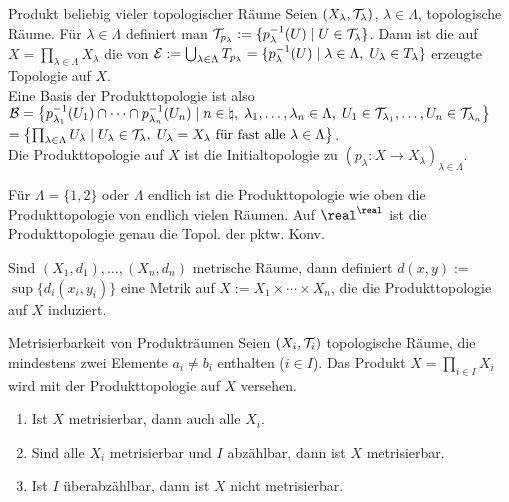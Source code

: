 \linie

\begin{Def}{Produkt beliebig vieler topologischer Räume}
    Seien $(X_\lambda, \mathcal{T}_\lambda)$, $\lambda \in \Lambda$, topologische Räume.
    Für $\lambda \in \Lambda$ definiert man
    $\mathcal{T}_{p_\lambda} := \{p_\lambda^{-1}(U) \;|\; U \in \mathcal{T}_\lambda\}$.
    Dann ist die  auf
    $X = \prod_{\lambda \in \Lambda} X_\lambda$ die von
    $\mathcal{E} := \bigcup_{\lambda \in \Lambda} T_{p_\lambda} =
    \{p_\lambda^{-1}(U) \;|\; \lambda \in \Lambda,\; U_\lambda \in T_\lambda\}$
    erzeugte Topologie auf $X$. \\
    Eine Basis der Produkttopologie ist also \\
    $\mathcal{B} = \left\{p_{\lambda_1}^{-1}(U_1) \cap \dotsb \cap
    p_{\lambda_n}^{-1}(U_n) \;|\; n \in \natural,\;
    \lambda_1, \dotsc, \lambda_n \in \Lambda,\;
    U_1 \in \mathcal{T}_{\lambda_1}, \dotsc, U_n \in \mathcal{T}_{\lambda_n}\right\}$ \\
    $= \left\{\prod_{\lambda \in \Lambda} U_\lambda \;|\;
    U_\lambda \in \mathcal{T}_\lambda,\;
    U_\lambda = X_\lambda \text{ für fast alle }
    \lambda \in \Lambda\right\}$. \\
    Die Produkttopologie auf $X$ ist die Initialtopologie zu
    $(p_\lambda\colon X \rightarrow X_\lambda)_{\lambda \in \Lambda}$.
\end{Def}

\begin{Bsp}
    Für $\Lambda = \{1, 2\}$ oder $\Lambda$ endlich ist die Produkttopologie
    wie oben die Produkttopologie von endlich vielen Räumen.
    Auf $\real^\real$ ist die Produkttopologie genau die Topol. der
    pktw. Konv.
\end{Bsp}

\linie

\begin{Bem}
    Sind $(X_1, d_1), \dotsc, (X_n, d_n)$ metrische Räume, dann definiert
    $d(x, y) :=$ \\
    $\sup\{d_i(x_i, y_i)\}$
    eine Metrik auf $X := X_1 \times \dotsb \times X_n$, die die
    Produkttopologie auf $X$ induziert.
\end{Bem}

\begin{Satz}{Metrisierbarkeit von Produkträumen}
    Seien $(X_i, \mathcal{T}_i)$ topologische Räume, die mindestens zwei Elemente
    $a_i \not= b_i$ enthalten ($i \in I$).
    Das Produkt $X = \prod_{i \in I} X_i$ wird mit der Produkttopologie
    auf $X$ versehen.
    \begin{enumerate}
        \item
        Ist $X$ metrisierbar, dann auch alle $X_i$.
        
        \item
        Sind alle $X_i$ metrisierbar und $I$ abzählbar, dann ist $X$
        metrisierbar.
        
        \item
        Ist $I$ überabzählbar, dann ist $X$ nicht metrisierbar.
    \end{enumerate}
\end{Satz}

